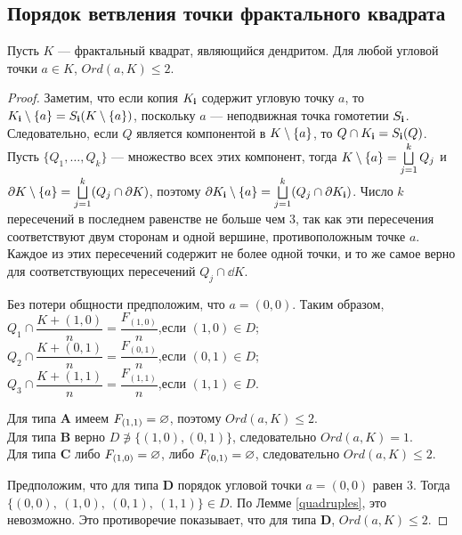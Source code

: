 \subsection{Порядок ветвления точки фрактального квадрата}

\begin{lemma}\label{thm:vertex_branching}
Пусть $K$ --- фрактальный квадрат, являющийся дендритом.
Для любой угловой точки $a\in K$,
 $Ord(a,K)\leq 2$.
\end{lemma}

\begin{proof}\label{proof:vertex_branching}
Заметим, что если копия $K_{\bf{i}}$ содержит угловую точку $a$, то 
$K_{\bf{i}}\setminus \{a\}=S_{\bf{i}}(K\setminus \{a\})$, поскольку $a$ --- неподвижная точка гомотетии $S_{\bf{i}}$.
Следовательно, если $Q$ является компонентой в $K\setminus \{a\}$, то $Q\cap K_{\bf{i}}=S_{\bf{i}}(Q)$. 
Пусть $\{Q_1,\ldots, Q_k\}$ --- множество всех этих компонент, тогда $K\setminus \{a\}=\bigsqcup \limits_{j=1}^kQ_j$ и $\partial K\setminus \{a\}=\bigsqcup \limits_{j=1}^k(Q_j\cap\partial K)$, поэтому $\partial K_{\bf{i}}\setminus \{a\}=\bigsqcup \limits_{j=1}^k(Q_j\cap\partial K_{\bf{i}})$. 
Число $k$ пересечений в последнем равенстве не больше чем $3$, так как эти пересечения соответствуют двум сторонам и одной вершине, противоположным точке $a$. 
Каждое из этих пересечений содержит не более одной точки, и то же самое верно для соответствующих пересечений $Q_j\cap\dd K$.

Без потери общности предположим, что  $a=(0,0)$.
Таким образом,\\ 
$Q_1\cap\dfrac{K+(1,0)}{n} =\dfrac{F_{(1,0)}}{n}$,\quad если $(1,0)\in D$;\\
$Q_2\cap\dfrac{K+(0,1)}{n} =\dfrac{F_{(0,1)}}{n}$,\quad если $(0,1)\in D$;\\ 
$Q_3\cap\dfrac{K+(1,1)}{n} =\dfrac{F_{(1,1)}}{n}$,\quad если $(1,1)\in D$.

\noindent 
Для типа {\bf A} имеем $F_{(1,1)}=\varnothing$, поэтому $Ord(a,K)\leq 2$.\\
Для типа {\bf B} верно $D\not\ni\{(1,0),(0,1)\}$, следовательно $Ord(a,K)=1$.\\
Для типа {\bf C} либо $F_{(1,0)}=\varnothing$, либо $F_{(0,1)}=\varnothing$, следовательно $Ord(a,K)\leq 2$.

Предположим, что для типа {\bf D} порядок угловой точки $a=(0,0)$ равен $3$.
Тогда $\{(0,0),\ (1,0),\ (0,1),\ (1,1)\}\in D$. 
По Лемме \ref{quadruples}, это невозможно.
Это противоречие показывает, что для типа {\bf D}, $Ord(a,K)\leq 2$.
\end{proof}

